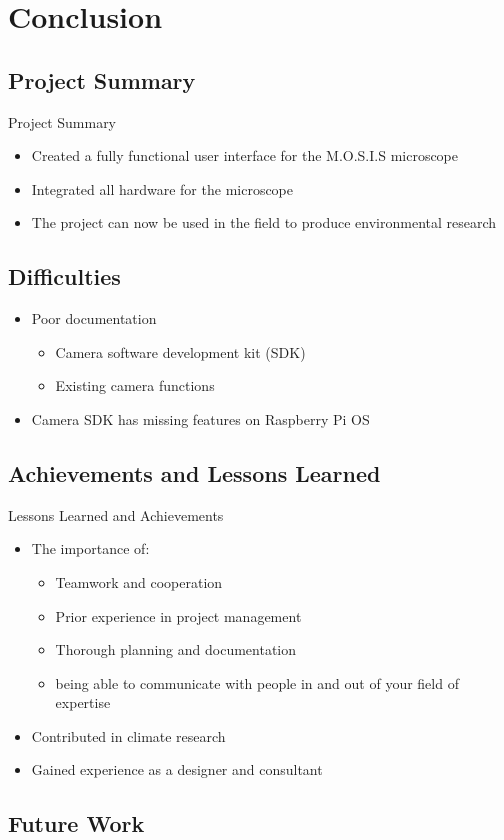 \documentclass[17pt, aspectratio=169]{beamer}
\begin{document}
\section{Conclusion}
\subsection{Project Summary}
\begin{frame}{Project Summary}
	\begin{itemize}
		\item Created a fully functional user interface for the M.O.S.I.S microscope
		\item Integrated all hardware for the microscope
		\item The project can now be used in the field to produce environmental research
	\end{itemize}
\end{frame}
\subsection{Difficulties}
\begin{frame}
	\begin{itemize}
		\item Poor documentation
		      \begin{itemize}
			      \item Camera software development kit (SDK)
			      \item Existing camera functions
		      \end{itemize}
		\item Camera SDK has missing features on Raspberry Pi OS
	\end{itemize}
\end{frame}
\subsection{Achievements and Lessons Learned}
\begin{frame}{Lessons Learned and Achievements}
	\begin{itemize}
		\item The importance of:
		      \begin{itemize}
			      \item Teamwork and cooperation
			      \item Prior experience in project management
			      \item Thorough planning and documentation
			      \item being able to communicate with people in and out of your field of expertise
		      \end{itemize}
		\item Contributed in climate research
		\item Gained experience as a designer and consultant
	\end{itemize}
\end{frame}
\subsection{Future Work}
\end{document}
